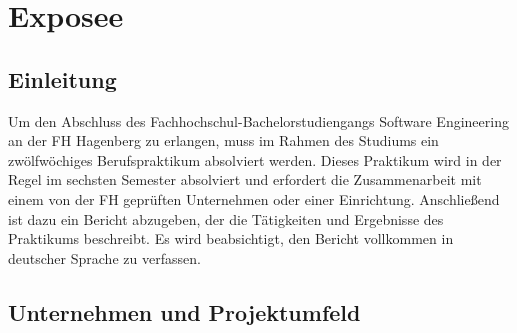 



\chapter{Exposee}

\section{Einleitung}

Um den Abschluss des Fachhochschul-Bachelorstudiengangs Software Engineering an der FH Hagenberg zu erlangen, muss im Rahmen des Studiums ein zwölfwöchiges
Berufspraktikum absolviert werden. Dieses Praktikum wird in der Regel im sechsten Semester absolviert und erfordert die Zusammenarbeit mit einem von der FH 
geprüften Unternehmen oder einer Einrichtung. Anschließend ist dazu ein Bericht abzugeben, der die Tätigkeiten
und Ergebnisse des Praktikums beschreibt. Es wird beabsichtigt, den Bericht vollkommen in deutscher Sprache zu verfassen.

\section{Unternehmen und Projektumfeld} \label{sec:unternehmen}


